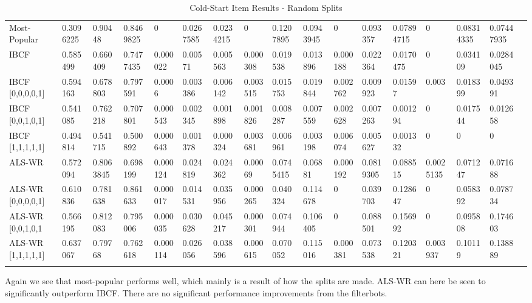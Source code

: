 \begin{table}[H]
{\begin{tabular}{*{17}{l}}
\rowcolor{Gray}
Most-Popular		& 0.3096225 & 0.90448 & 0.8469825 & 0 & 0.0267585 & 0.0234215 & 0 & 0.1207895 & 0.0943945 & 0 & 0.093357 & 0.07894715 & 0 & 0.08314335 & 	0.07447935 & \\
\rowcolor{Gray}
IBCF				& 0.585499& 0.660409& 	0.7477435 & 0.000022 & 0.00571 & 0.005563 & 0.000308 & 0.019538 & 0.013896 & 0.000188 & 0.022364 & 0.0170475 & 0 & 0.034109 & 0.0284045 & \\
IBCF [0,0,0,0,1] 	& 0.594163&	0.678803&	0.797591&	0.0006	&	0.003386&	0.006142&	0.003515&	0.015753&	0.019844	&	0.002762	&	0.009923	&	0.01597	&	0.003	&	0.018399	&	0.049391	& \\
IBCF [0,0,1,0,1] 	& 0.541085&	0.762218&	0.707801&	0.000543&	0.002345&	0.001898&	0.001826&	0.008287&	0.007559&	0.002628&	0.007263&	0.001294&	0	&	0.017544	&	0.012658	& \\
IBCF [1,1,1,1,1]	& 0.494814&	0.541715&	0.500892&	0.000643&	0.001378&	0.000324&	0.003681&	0.006961&	0.003198&	0.006074&	0.005627&	0.001332&	0	&	0	&	0	& \\
\rowcolor{Gray}
ALS-WR 				& 0.572094& 0.8063845& 	0.698199&   0.000124&	0.024819&	0.024362&	0.00069	&	0.0745415&	0.06881	&	0.000192&	0.0819305&	0.088515&	0.0025135&	0.071247&	0.071688	& \\
ALS-WR [0,0,0,0,1]  & 0.610836&	0.781638&	0.861633&	0.000017&	0.014531&	0.035956&	0.000265&	0.040324&	0.114678&	0	&	0.039703&	0.128647&	0	&	0.058392	&	0.078734	& \\
ALS-WR [0,0,1,0,1	& 0.566195&	0.812083&	0.795006&	0.000035&	0.030628&	0.045217&	0.000301&	0.074944&	0.106405&	0	&	0.088501&	0.156992&	0&	0.095808&	0.174603	& \\
ALS-WR [1,1,1,1,1]	& 0.637067& 0.79768	&	0.762618&	0.000114&	0.026056&	0.038596&	0.000615&	0.070052&	0.115016&	0.000381&	0.073538&	0.120321&	0.003937	&	0.10119	&	0.138889	& \\ \\

\bottomrule
\end{tabular}
}
\caption{Cold-Start Item Results - Random Splits}
\end{table}

Again we see that most-popular performs well, which mainly is a result of how the splits are made. ALS-WR can here be seen to significantly outperform
IBCF. There are no significant performance improvements from the filterbots.


